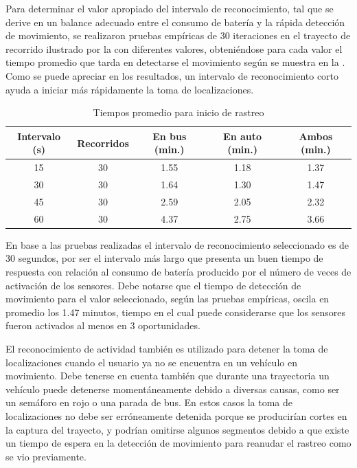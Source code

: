 Para determinar el valor apropiado del intervalo de reconocimiento, tal que se derive en un balance adecuado entre el consumo de batería y la rápida detección de movimiento, se realizaron pruebas empíricas de 30 iteraciones en el trayecto de recorrido ilustrado por la  con diferentes valores, obteniéndose para cada valor el tiempo promedio que tarda en detectarse el movimiento según se muestra en la . Como se puede apreciar en los resultados, un intervalo de reconocimiento corto ayuda a iniciar más rápidamente la toma de localizaciones.


\begin{table}[h]
  \centering
	\begin{tabular}{ccccc}
	\toprule
	Intervalo (s) & Recorridos & En bus (min.) & En auto (min.) & Ambos (min.) \\
	\midrule
	15            & 30       & 1.55         & 1.18            & 1.37         \\
	30            & 30       & 1.64         & 1.30            & 1.47         \\
	45            & 30       & 2.59         & 2.05            & 2.32         \\
	60            & 30       & 4.37         & 2.75            & 3.66         \\
	\bottomrule
	\end{tabular}
  \caption{Tiempos promedio para inicio de rastreo}
  \label{tab:prom_intervalo_reconocimiento}
\end{table}

En base a las pruebas realizadas el intervalo de reconocimiento seleccionado es de 30 segundos, por ser el intervalo más largo que presenta un buen tiempo de respuesta con relación al consumo de batería producido por el número de veces de activación de los sensores. Debe notarse que el tiempo de detección de movimiento para el valor seleccionado, según las pruebas empíricas, oscila en promedio los 1.47 minutos, tiempo en el cual puede considerarse que los sensores fueron activados al menos en 3 oportunidades.

El reconocimiento de actividad también es utilizado para detener la toma de localizaciones cuando el usuario ya no se encuentra en un vehículo en movimiento. Debe tenerse en cuenta también que durante una trayectoria un vehículo puede detenerse momentáneamente debido a diversas causas, como ser un semáforo en rojo o una parada de bus. En estos casos la toma de localizaciones no debe ser erróneamente detenida porque se producirían cortes en la captura del trayecto, y podrían omitirse algunos segmentos debido a que existe un tiempo de espera en la detección de movimiento para reanudar el rastreo como se vio previamente.

